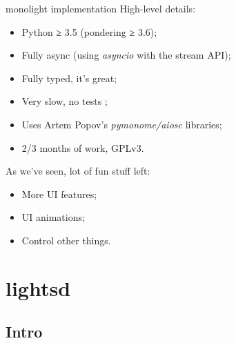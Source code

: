 \documentclass[utf8x,xcolor={usenames,svgnames}]{beamer}
\begin{document}
\begin{frame}{monolight implementation}
High-level details:
\begin{itemize}
\item Python ≥ 3.5 (pondering ≥ 3.6);
\item Fully async (using \emph{asyncio} with the stream API);
\item Fully typed, it's great;
\item Very slow, no tests \Neutrey;
\item Uses Artem Popov's \emph{pymonome/aiosc} libraries;
\item 2/3 months of work, GPLv3.
\end{itemize}
\pause
\vspace{1em}
As we've seen, lot of fun stuff left:
\begin{itemize}
\item More UI features;
\item UI animations;
\item Control other things.
\end{itemize}
\end{frame}

\section{lightsd}

\subsection{Intro}
\end{document}
